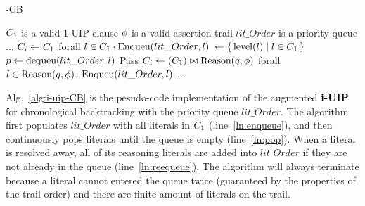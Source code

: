 \begin{algorithm}[t]
\caption{\IUIP-CB}\label{alg:i-uip-CB}
\begin{algorithmic}[1]
\Require  $C_{1}$ is a valid 1-UIP clause
\Require  $\phi$ is a valid assertion trail
\Require  $lit\_Order$ is a priority queue
    \State ...
    \State $C_{i} \gets C_{1} $ 
    \State forall $l \in C_{1} \cdot \text{Enqueu}(lit\_Order, l)$  \label{ln:enqueue}
    \State {} $\gets \{\,\text{level}(l)\mid l \in C_{1}\,\}$
     \label{ln:pop}
        \State $p \gets \text{dequeu}(lit\_Order, l) $ \label{ln:dequeue}
         \label{ln:resolvable}
          \State Pass
        \Else 
            \State  $C_{i} \gets (C_{1} ) \bowtie \text{Reason}(q, \phi)$
            \State   forall $l \in \text{Reason}(q, \phi) \cdot \text{Enqueu}(lit\_Order, l)$ \label{ln:reequeue}
        \EndIf
    \EndWhile
\State ...
\EndProcedure
\end{algorithmic}
\end{algorithm}

Alg.~\ref{alg:i-uip-CB} is the pesudo-code implementation of the augmented $\textbf{i-UIP}$ for chronological backtracking with the priority queue $lit\_Order$. The algorithm first populates $lit\_Order$ with all literals in $C_{1}$ (line~\ref{ln:enqueue}), and then continuously pops literals until the queue is empty (line~\ref{ln:pop}). When a literal is resolved away, all of its reasoning literals are added into $lit\_Order$ if they are not already in the queue (line~\ref{ln:reequeue}). The algorithm will always terminate because a literal cannot entered the queue twice (guaranteed by the properties of the trail order) and there are finite amount of literals on the trail.